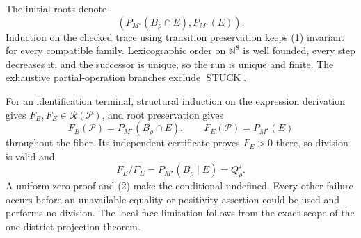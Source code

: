 The initial roots denote
\[
(P_{M^\star}(B_\rho\cap E),P_{M^\star}(E)).
\tag{1}
\]
Induction on the checked trace using transition preservation keeps (1) invariant for every compatible family.  Lexicographic order on \(\mathbb N^8\) is well founded, every step decreases it, and the successor is unique, so the run is unique and finite.  The exhaustive partial-operation branches exclude \(\operatorname{STUCK}\).

For an identification terminal, structural induction on the expression derivation gives \(F_B,F_E\in\mathscr R(\mathcal P)\), and root preservation gives
\[
F_B(\mathcal P)=P_{M^\star}(B_\rho\cap E),
\qquad
F_E(\mathcal P)=P_{M^\star}(E)
\tag{2}
\]
throughout the fiber.  Its independent certificate proves \(F_E>0\) there, so division is valid and
\[
F_B/F_E=P_{M^\star}(B_\rho\mid E)=Q_\rho^\star.
\]
A uniform-zero proof and (2) make the conditional undefined.  Every other failure occurs before an unavailable equality or positivity assertion could be used and performs no division.  The local-face limitation follows from the exact scope of the one-district projection theorem.